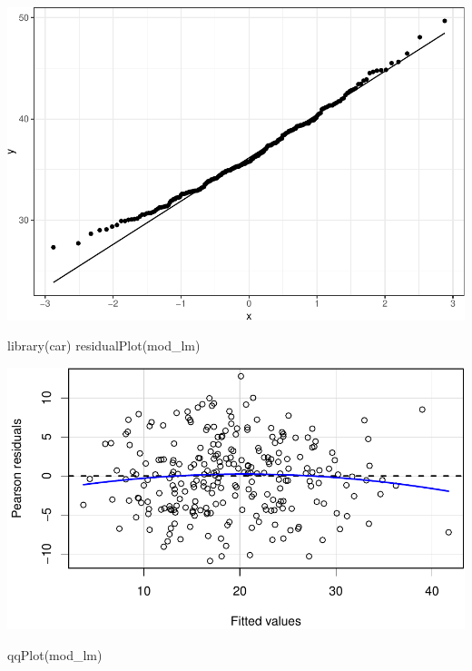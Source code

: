 \documentclass[
]{article}
\newenvironment{Shaded}{\begin{snugshade}}{\end{snugshade}}
\newcommand{\FunctionTok}[1]{\textcolor[rgb]{0.00,0.00,0.00}{#1}}
\newcommand{\NormalTok}[1]{#1}
\begin{document}
\begin{center}\includegraphics{CHAP23_files/figure-latex/unnamed-chunk-4-2} \end{center}

\begin{Shaded}
\begin{Highlighting}[]
\FunctionTok{library}\NormalTok{(car)}
\FunctionTok{residualPlot}\NormalTok{(mod\_lm)}
\end{Highlighting}
\end{Shaded}

\begin{center}\includegraphics{CHAP23_files/figure-latex/unnamed-chunk-5-1} \end{center}

\begin{Shaded}
\begin{Highlighting}[]
\FunctionTok{qqPlot}\NormalTok{(mod\_lm)}
\end{Highlighting}
\end{Shaded}
\end{document}
